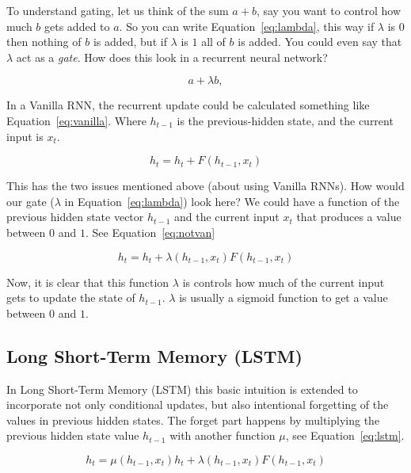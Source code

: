 \documentclass[12pt]{IEEEtran}
\begin{document}
To understand gating, let us think of the sum $a + b$, say you want to
control how much $b$ gets added to $a$. So you can write
Equation~\ref{eq:lambda}, this way if $\lambda$ is $0$ then nothing of $b$ is
added, but if $\lambda$ is $1$ all of $b$ is added. You could even say that
$\lambda$ act as a \emph{gate}.  How does this look in a recurrent neural
network?

\begin{equation}
    a + \lambda b,
    \label{eq:lambda}
\end{equation}

In a Vanilla RNN, the recurrent update could be calculated something like
Equation~\ref{eq:vanilla}. Where $h_{t-1}$ is the previous-hidden state, and
the current input is $x_t$.

\begin{equation}
    h_t = h_t + F(h_{t-1}, x_t)
    \label{eq:vanilla}
\end{equation}

This has the two issues mentioned above (about using Vanilla RNNs). How would our gate
($\lambda$ in Equation~\ref{eq:lambda}) look here? We could have a function of
the previous hidden state vector $h_{t-1}$ and the current input $x_t$ that
produces a value between $0$ and $1$. See Equation~\ref{eq:notvan}

\begin{equation}
    h_t = h_t + \lambda (h_{t-1}, x_t)F(h_{t-1}, x_t)
    \label{eq:notvan}
\end{equation}

Now, it is clear that this function $\lambda$ is controls how much of the
current input gets to update the state of $h_{t-1}$. $\lambda$ is usually a
sigmoid function to get a value between $0$ and $1$.

\subsection{Long Short-Term Memory (LSTM)}

In Long Short-Term Memory (LSTM) this basic intuition is extended to
incorporate not only conditional updates, but also intentional forgetting of
the values in previous hidden states. The forget part happens by multiplying
the previous hidden state value $h_{t-1}$ with another function $\mu$, see
Equation~\ref{eq:lstm}.

\begin{equation}
    h_t = \mu (h_{t-1}, x_t) h_t + \lambda (h_{t-1}, x_t)F(h_{t-1}, x_t)
    \label{eq:lstm}
\end{equation}
\end{document}
